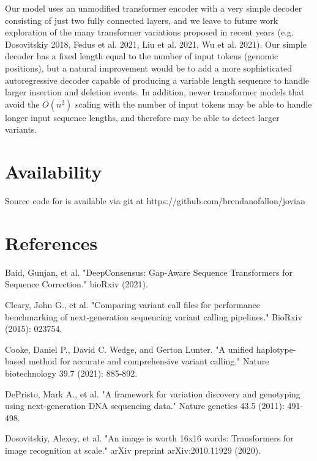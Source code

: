 \documentclass[]{article}
\begin{document}
Our model uses an unmodified transformer encoder with a very simple decoder consisting of just two fully connected layers, and we leave to future work exploration of the many transformer variations proposed in recent years (e.g. Dosovitskiy 2018, Fedus et al. 2021, Liu et al. 2021, Wu et al. 2021). Our simple decoder has a fixed length equal to the number of input tokens (genomic positions), but a natural improvement would be to add a more sophisticated autoregressive decoder capable of producing a variable length sequence to handle larger insertion and deletion events.  In addition, newer transformer models that avoid the $O(n^2)$ scaling with the number of input tokens may be able to handle longer input sequence lengths, and therefore may be able to detect larger variants. 


\section{Availability}
 
 Source code for is available via git at https://github.com/brendanofallon/jovian
 
\section{References}

\vspace{8pt}
Baid, Gunjan, et al. "DeepConsensus: Gap-Aware Sequence Transformers for Sequence Correction." bioRxiv (2021).

\vspace{8pt}
Cleary, John G., et al. "Comparing variant call files for performance benchmarking of next-generation sequencing variant calling pipelines." BioRxiv (2015): 023754.

\vspace{8pt}
Cooke, Daniel P., David C. Wedge, and Gerton Lunter. "A unified haplotype-based method for accurate and comprehensive variant calling." Nature biotechnology 39.7 (2021): 885-892.

\vspace{8pt}
DePristo, Mark A., et al. "A framework for variation discovery and genotyping using next-generation DNA sequencing data." Nature genetics 43.5 (2011): 491-498.
 
\vspace{8pt}
Dosovitskiy, Alexey, et al. "An image is worth 16x16 words: Transformers for image recognition at scale." arXiv preprint arXiv:2010.11929 (2020).
\end{document}
